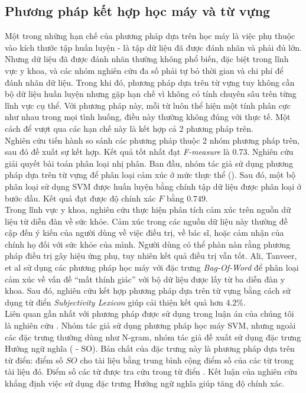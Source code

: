 \subsection{Phương pháp kết hợp học máy và từ vựng}
Một trong những hạn chế của phương pháp dựa trên học máy là việc phụ thuộc vào kích thước tập huấn luyện - là tập dữ liệu đã được đánh nhãn và phải đủ lớn. Nhưng dữ liệu đã được đánh nhãn thường không phổ biến, đặc biệt trong lĩnh vực y khoa, và các nhóm nghiên cứu đa số phải tự bỏ thời gian và chi phí để đánh nhãn dữ liệu. Trong khi đó, phương pháp dựa trên từ vựng tuy không cần bộ dữ liệu huấn luyện nhưng gặp hạn chế vì không có tính chuyên sâu trên từng lĩnh vực cụ thể. Với phương pháp này, mỗi từ luôn thể hiện một tính phân cực như nhau trong mọi tình huống, điều này thường không đúng với thực tế. Một cách để vượt qua các hạn chế này là kết hợp cả 2 phương pháp trên.\\

Nghiên cứu \cite{gonccalves2013comparing} tiến hành so sánh các phương pháp thuộc 2 nhóm phương pháp trên, sau đó đề xuất sự kết hợp. Kết quả tốt nhất đạt \textit{F-measure} là 0.73. Nghiên cứu \cite{Zhang2015} giải quyết bài toán phân loại nhị phân. Ban đầu, nhóm tác giả sử dụng phương pháp dựa trên từ vựng để phân loại cảm xúc ở mức thực thể (). Sau đó, một bộ phân loại sử dụng SVM được huấn luyện bằng chính tập dữ liệu được phân loại ở bước đầu. Kết quả đạt được độ chính xác $F$ bằng $0.749$.\\

Trong lĩnh vực y khoa, nghiên cứu \cite{ali2013can} thực hiện phân tích cảm xúc trên nguồn dữ liệu từ diễn đàn về sức khỏe. Cảm xúc trong các nguồn dữ liệu này thường đề cập đến ý kiến của người dùng về việc điều trị, về bác sĩ, hoặc cảm nhận của chính họ đối với sức khỏe của mình. Người dùng có thể phàn nàn rằng phương pháp điều trị gây hiệu ứng phụ, tuy nhiên kết quả điều trị vẫn tốt. Ali, Tanveer, et al \cite{ali2013can} sử dụng các phương pháp học máy với đặc trưng \textit{Bag-Of-Word} để phân loại cảm xúc về vấn đề ``mất thính giác'' với bộ dữ liệu được lấy từ ba diễn đàn y khoa\footnotemark. Sau đó, nghiên cứu kết hợp phương pháp dựa trên từ vựng bằng cách sử dụng từ điển \textit{Subjectivity Lexicon} giúp cải thiện kết quả hơn 4.2\%. \\

Liên quan gần nhất với phương pháp được sử dụng trong luận án của chúng tôi là nghiên cứu \cite{sarker2011outcome}. Nhóm tác giả sử dụng phương pháp học máy SVM, nhưng ngoài các đặc trưng thường dùng như N-gram, nhóm tác giả đề xuất sử dụng đặc trưng Hướng ngữ nghĩa ( - SO). Bản chất của đặc trưng này là phương pháp dựa trên từ điển: điểm số $SO$ cho tài liệu bằng trung bình cộng điểm số của các từ trong tài liệu đó. Điểm số các từ được tra cứu trong từ điển . Kết luận của nghiên cứu khẳng định việc sử dụng đặc trưng Hướng ngữ nghĩa giúp tăng độ chính xác.